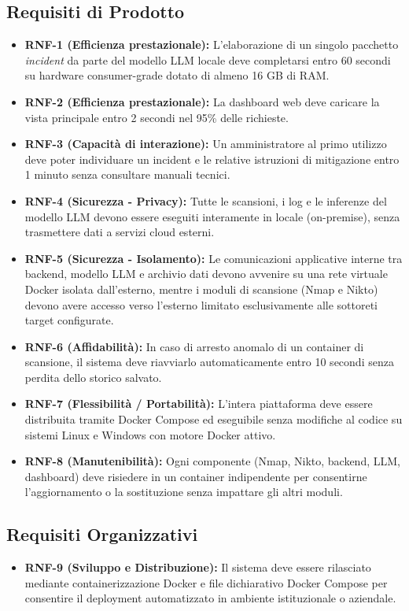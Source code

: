 \documentclass{article}
\begin{document}
\subsection{Requisiti di Prodotto}
\begin{itemize}
    \item \textbf{RNF-1 (Efficienza prestazionale):} L'elaborazione di un singolo pacchetto \textit{incident} da parte del modello LLM locale deve completarsi entro 60 secondi su hardware consumer-grade dotato di almeno 16 GB di RAM.
    \item \textbf{RNF-2 (Efficienza prestazionale):} La dashboard web deve caricare la vista principale entro 2 secondi nel 95\% delle richieste.
    \item \textbf{RNF-3 (Capacità di interazione):} Un amministratore al primo utilizzo deve poter individuare un incident e le relative istruzioni di mitigazione entro 1 minuto senza consultare manuali tecnici.
    \item \textbf{RNF-4 (Sicurezza - Privacy):} Tutte le scansioni, i log e le inferenze del modello LLM devono essere eseguiti interamente in locale (on-premise), senza trasmettere dati a servizi cloud esterni.
    \item \textbf{RNF-5 (Sicurezza - Isolamento):} Le comunicazioni applicative interne tra backend, modello LLM e archivio dati devono avvenire su una rete virtuale Docker isolata dall'esterno, mentre i moduli di scansione (Nmap e Nikto) devono avere accesso verso l'esterno limitato esclusivamente alle sottoreti target configurate.
    \item \textbf{RNF-6 (Affidabilità):} In caso di arresto anomalo di un container di scansione, il sistema deve riavviarlo automaticamente entro 10 secondi senza perdita dello storico salvato.
    \item \textbf{RNF-7 (Flessibilità / Portabilità):} L'intera piattaforma deve essere distribuita tramite Docker Compose ed eseguibile senza modifiche al codice su sistemi Linux e Windows con motore Docker attivo.
    \item \textbf{RNF-8 (Manutenibilità):} Ogni componente (Nmap, Nikto, backend, LLM, dashboard) deve risiedere in un container indipendente per consentirne l'aggiornamento o la sostituzione senza impattare gli altri moduli.
\end{itemize}

\subsection{Requisiti Organizzativi}
\begin{itemize}
    \item \textbf{RNF-9 (Sviluppo e Distribuzione):} Il sistema deve essere rilasciato mediante containerizzazione Docker e file dichiarativo Docker Compose per consentire il deployment automatizzato in ambiente istituzionale o aziendale.
\end{itemize}
\end{document}
